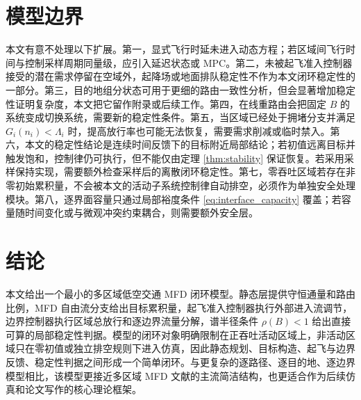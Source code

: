 \documentclass[a4paper,12pt]{article}
\theoremstyle{plain}
\theoremstyle{definition}
\theoremstyle{remark}
\begin{document}
\section{模型边界}

本文有意不处理以下扩展。第一，显式飞行时延未进入动态方程；若区域间飞行时间与控制采样周期同量级，应引入延迟状态或 MPC。第二，未被起飞准入控制器接受的潜在需求停留在空域外，起降场或地面排队稳定性不作为本文闭环稳定性的一部分。第三，目的地组分状态可用于更细的路由一致性分析，但会显著增加稳定性证明复杂度，本文把它留作附录或后续工作。第四，在线重路由会把固定 $B$ 的系统变成切换系统，需要新的稳定性条件。第五，当区域已经处于拥堵分支并满足 $G_i(n_i)<\Lambda_i$ 时，提高放行率也可能无法恢复，需要需求削减或临时禁入。第六，本文的稳定性结论是连续时间反馈下的目标附近局部结论；若初值远离目标并触发饱和，控制律仍可执行，但不能仅由定理 \ref{thm:stability} 保证恢复。若采用采样保持实现，需要额外检查采样后的离散闭环稳定性。第七，零吞吐区域若存在非零初始累积量，不会被本文的活动子系统控制律自动排空，必须作为单独安全处理模块。第八，逐界面容量只通过局部裕度条件 \eqref{eq:interface_capacity} 覆盖；若容量随时间变化或与微观冲突约束耦合，则需要额外安全层。

\section{结论}

本文给出一个最小的多区域低空交通 MFD 闭环模型。静态层提供守恒通量和路由比例，MFD 自由流分支给出目标累积量，起飞准入控制器执行外部进入流调节，边界控制器执行区域总放行和逐边界流量分解，谱半径条件 $\rho(B)<1$ 给出直接可算的局部稳定性判据。模型的闭环对象明确限制在正吞吐活动区域上，非活动区域只在零初值或独立排空规则下进入仿真，因此静态规划、目标构造、起飞与边界反馈、稳定性判据之间形成一个简单闭环。与更复杂的逐路径、逐目的地、逐边界模型相比，该模型更接近多区域 MFD 文献的主流简洁结构，也更适合作为后续仿真和论文写作的核心理论框架。
\end{document}
